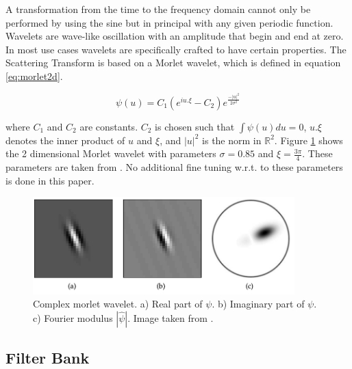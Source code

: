 A transformation from the time to the frequency domain cannot only be performed by using the sine but in principal with any given periodic function.
Wavelets are wave-like oscillation with an amplitude that begin and end at zero. In most use cases wavelets are specifically crafted to have certain properties. 
The Scattering Transform is based on a Morlet wavelet, which is defined in equation \ref{eq:morlet2d}.

\begin{equation}
	\psi(u) = C_1 (e^{iu.\xi} - C_2) e^{\frac{-|u|^2}{2\sigma^2}}
	\label{eq:morlet2d}
\end{equation}


where $C_1$ and $C_2$ are constants. $C_2$ is chosen such that $\int \psi(u) du = 0$, $u.\xi$ denotes the inner product of $u$ and $\xi$, and $|u|^2$ is the norm in $\mathbb{R}^2$. 
Figure \ref{fig:morlet2d} shows the 2 dimensional Morlet wavelet with parameters $\sigma = 0.85$ and $\xi = \frac{3\pi}{4}$. These parameters are taken from \cite{scatteringTransform2012}. No additional fine tuning w.r.t. to these parameters is done in this paper. 

\begin{figure}[!htb]
	\centering
	\includegraphics[width = 0.9\textwidth]{images/morlet2d.png}
	\caption{Complex morlet wavelet. a) Real part of $\psi$. b) Imaginary part of $\psi$. c) Fourier modulus $|\hat{\psi}|$. Image taken from \cite{scatteringTransform2012}.}
	\label{fig:morlet2d}
\end{figure}

\subsection{Filter Bank}

